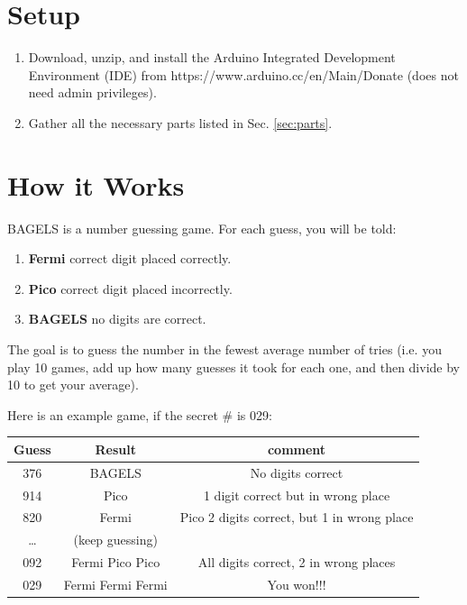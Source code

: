 \documentclass{article}
\begin{document}
\section{Setup}
\begin{enumerate}
\item {Download, unzip, and install the Arduino Integrated Development Environment
    (IDE) from https://www.arduino.cc/en/Main/Donate (does not need admin
    privileges).}
\item {Gather all the necessary parts listed in Sec. \ref{sec:parts}}.
\end{enumerate}

\section{How it Works}
BAGELS is a number guessing game. For each guess, you will be told:

\begin{enumerate}
\item {\textbf{Fermi} correct digit placed correctly.}
\item {\textbf{Pico} correct digit placed incorrectly.}
\item {\textbf{BAGELS} no digits are correct.}
\end{enumerate}

The goal is to guess the number in the fewest average number of tries (i.e. you play
10 games, add up how many guesses it took for each one, and then divide by 10 to get
your average).

\vspace{1cm}

Here is an example game, if the secret \# is 029:

\vspace{1cm}

\begin{tabular}{c| c| c}
  \hline
  Guess &	Result &	comment \\
  \hline
  376	& BAGELS &	No digits correct\\
  914	& Pico	&1 digit correct but in wrong place\\
  820	& Fermi &Pico	2 digits correct, but 1 in wrong place\\
  \dots	& (keep guessing) &\\
  092	& Fermi Pico Pico &	All digits correct, 2 in wrong places\\
  029	& Fermi Fermi Fermi & You won!!!\\
\end{tabular}
\end{document}
